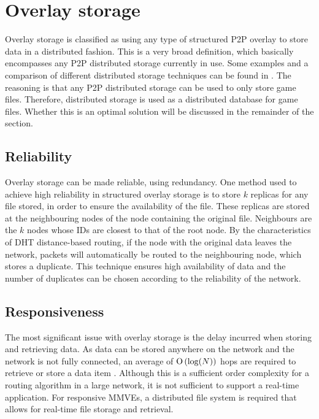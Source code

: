 \section{Overlay storage}
\label{overlay_storage}

Overlay storage is classified as using any type of structured P2P overlay to store data in a distributed fashion. This is a very broad definition,
which basically encompasses any P2P distributed storage currently in use. Some examples and a comparison of different distributed storage techniques
can be found in \cite{Hasan_distributed_storage_survey}. The reasoning is that any P2P distributed storage can be used to only store game files.
Therefore, distributed storage is used as a distributed database for game files. Whether this is an optimal solution will be discussed in the
remainder of the section.

\subsection{Reliability}
\label{overlay_storage_reliability}

Overlay storage can be made reliable, using redundancy. One method used to achieve high reliability in structured overlay storage is to store $k$
replicas for any file stored, in order to ensure the availability of the file. These replicas are stored at the neighbouring nodes of the node
containing the original file. Neighbours are the $k$ nodes whose IDs are closest to that of the root node. By the characteristics of DHT
distance-based routing, if the node with the original data leaves the network, packets will automatically be routed to the neighbouring node, which
stores a duplicate. This technique ensures high availability of data and the number of duplicates can be chosen according to the reliability of the
network.


\subsection{Responsiveness}

The most significant issue with overlay storage is the delay incurred when storing and retrieving data. As data can be stored anywhere on the network
and the network is not fully connected, an average of $\operatorname{O}\left(\log(N)\right)$ hops are required to retrieve or store a data item
\cite{storage_and_chaching_PAST}. Although this is a sufficient order complexity for a routing algorithm in a large network, it is not sufficient to
support a real-time application. For responsive MMVEs, a distributed file system is required that allows for real-time file storage and retrieval.

